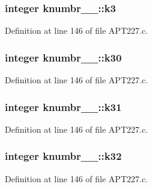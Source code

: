 \subsubsection[{\texorpdfstring{k3}{k3}}]{\setlength{\rightskip}{0pt plus 5cm}integer knumbr\+\_\+\_\+\+::k3}\hypertarget{structknumbr__1___a13eae5ff7cefea5ccd47c77415c232b6}{}\label{structknumbr__1___a13eae5ff7cefea5ccd47c77415c232b6}


Definition at line 146 of file A\+P\+T227.\+c.

\subsubsection[{\texorpdfstring{k30}{k30}}]{\setlength{\rightskip}{0pt plus 5cm}integer knumbr\+\_\+\_\+\+::k30}\hypertarget{structknumbr__1___a70137a4c5c41f444c46df109a528da60}{}\label{structknumbr__1___a70137a4c5c41f444c46df109a528da60}


Definition at line 146 of file A\+P\+T227.\+c.

\subsubsection[{\texorpdfstring{k31}{k31}}]{\setlength{\rightskip}{0pt plus 5cm}integer knumbr\+\_\+\_\+\+::k31}\hypertarget{structknumbr__1___ac7102b4b8ecea5e61da2e464d2164d55}{}\label{structknumbr__1___ac7102b4b8ecea5e61da2e464d2164d55}


Definition at line 146 of file A\+P\+T227.\+c.

\subsubsection[{\texorpdfstring{k32}{k32}}]{\setlength{\rightskip}{0pt plus 5cm}integer knumbr\+\_\+\_\+\+::k32}\hypertarget{structknumbr__1___a3881be9b03876d9120e904e32592ea1a}{}\label{structknumbr__1___a3881be9b03876d9120e904e32592ea1a}


Definition at line 146 of file A\+P\+T227.\+c.

